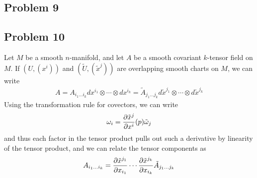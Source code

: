 \documentclass{../../mathnotes}
\begin{document}
\subsection*{Problem 9}

\subsection*{Problem 10}

Let $M$ be a smooth $n$-manifold, and let $A$ be a smooth covariant $k$-tensor field on $M$. If $(U,(x^i))$ and $(\tilde U,(\tilde x^j))$
are overlapping smooth charts on $M$, we can write
\begin{align*}
    A=A_{i_1\ldots i_k}dx^{i_1}\otimes \cdots \otimes dx^{i_k}=\tilde A_{j_1\ldots j_k}d\tilde x^{j_1}\otimes \cdots \otimes d\tilde x^{j_k}
\end{align*}
Using the transformation rule for covectors, we can write
\begin{align*}
    \omega_i=\frac{\partial \tilde x^j}{\partial x^i}(p) \tilde \omega_j
\end{align*}
and thus each factor in the tensor product pulls out such a derivative by linearity of the tensor product, and we can relate
the tensor components as
\begin{align*}
    A_{i_1\ldots i_k}=\frac{\partial \tilde x^{j_1}}{\partial x_{i_1}}\cdots\frac{\partial \tilde x^{j_k}}{\partial x_{i_k}} \tilde A_{j_1\ldots j_k}
\end{align*}
\end{document}

